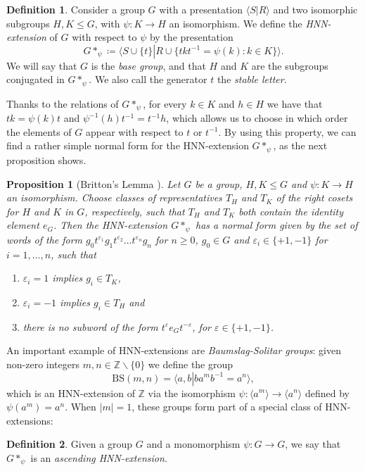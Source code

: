\documentclass[letterpaper,11pt,reqno]{amsart}
\theoremstyle{plain}
\newtheorem{proposition}[theorem]{Proposition}
\theoremstyle{definition}
\newtheorem{definition}{Definition}[section]
\begin{document}
\begin{definition}\label{definition.hnn_extension} Consider a group $G$ with a presentation $\langle S\left|\right. R\rangle$ and two isomorphic subgroups $H,K\le G$, with $\psi:K\to H$ an isomorphism. We define the \textit{HNN-extension} of $G$ with respect to $\psi$ by the presentation
	$$
	G*_{\psi}\coloneqq \langle S\cup\{t\} \left|\right. R\cup \{t k t^{-1}=\psi(k): k\in K \} \rangle.
	$$
	We will say that $G$ is the \textit{base group}, and that $H$ and $K$ are the subgroups conjugated in $G*_{\psi}$. We also call the generator $t$ the \textit{stable letter}.
\end{definition}
Thanks to the relations of $G*_{\psi}$, for every $k\in K$ and $h\in H$ we have that $tk=\psi(k)t$ and $\psi^{-1}(h)t^{-1}=t^{-1}h$, which allows us to choose in which order the elements of $G$ appear with respect to $t$ or $t^{-1}$. By using this property, we can find a rather simple normal form for the HNN-extension $G*_{\psi}$, as the next proposition shows.

\begin{proposition}[Britton's Lemma {\cite[Theorem~IV.2.1]{lyndon_schupp_1977}}] \label{prop:hnn_general_normal_form}Let $G$ be a group, $H,K\le G$ and $\psi:K\to H$ an isomorphism. 
	Choose classes of representatives $T_H$ and $T_K$ of the right cosets for $H$ and $K$ in $G$, respectively, such that $T_H$ and $T_K$ both contain the identity element $e_G$. Then the HNN-extension $G*_\psi$ has a normal form given by the set of words of the form $g_0t^{\varepsilon_1}g_1t^{\varepsilon_2}\ldots t^{\varepsilon_n}g_n$ for $n\ge 0$, $g_0\in G$ and $\varepsilon_i\in \{+1,-1\}$ for $i=1,\ldots,n$, such that
	\begin{enumerate}
		\item $\varepsilon_i=1 $ implies $g_i\in T_K$,
		\item $\varepsilon_i=-1$ implies $g_i\in T_H$ and 
		\item there is no subword of the form $t^\varepsilon e_G t^{-\varepsilon}$, for $\varepsilon\in\{+1,-1\}$.
	\end{enumerate} 
\end{proposition}

An important example of HNN-extensions are \textit{Baumslag-Solitar groups}: given non-zero integers $m,n\in \mathbb{Z}\backslash\{0\}$ we define the group 
$$\mathrm{BS}(m,n)=\langle a,b \left|\right. ba^mb^{-1}=a^n\rangle,$$ 
which is an HNN-extension of $\mathbb{Z}$ via the isomorphism $\psi:\langle a^m \rangle\to \langle a^n\rangle$ defined by $\psi(a^m)=a^n$. When $|m|=1$, these groups form part of a special class of HNN-extensions:
\begin{definition}\label{def:ascending hnn extension} Given a group $G$ and a monomorphism $\psi:G\to G$, we say that $G*_{\psi}$ is an \textit{ascending HNN-extension}.
\end{definition}
\end{document}
